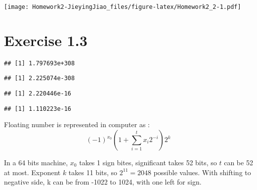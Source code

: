 \documentclass[]{book}
\newenvironment{Shaded}{\begin{snugshade}}{\end{snugshade}}
\newcommand{\NormalTok}[1]{#1}
\newcommand{\OperatorTok}[1]{\textcolor[rgb]{0.81,0.36,0.00}{\textbf{#1}}}
\begin{document}
\texttt{[image: Homework2-JieyingJiao\_files/figure-latex/Homework2\_2-1.pdf]}

\hypertarget{exercise-1.3}{%
\chapter{Exercise 1.3}\label{exercise-1.3}}

\begin{Shaded}
\end{Shaded}

\begin{verbatim}
## [1] 1.797693e+308
\end{verbatim}

\begin{Shaded}
\end{Shaded}

\begin{verbatim}
## [1] 2.225074e-308
\end{verbatim}

\begin{Shaded}
\end{Shaded}

\begin{verbatim}
## [1] 2.220446e-16
\end{verbatim}

\begin{Shaded}
\end{Shaded}

\begin{verbatim}
## [1] 1.110223e-16
\end{verbatim}

Floating number is represented in computer as :
\[(-1)^{x_0}(1+\sum_{i = 1}^tx_i2^{-i})2^k\]

In a 64 bits machine, \(x_0\) takes 1 sign bites, significant takes 52
bits, so \(t\) can be 52 at most. Exponent \(k\) takes 11 bits, so
\(2^11 = 2048\) possible values. With shifting to negative side, k can
be from -1022 to 1024, with one left for sign.
\end{document}
